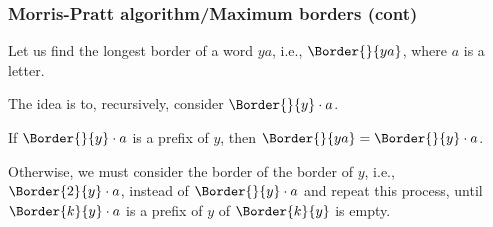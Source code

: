 %
\begin{frame}
\frametitle{Morris-Pratt algorithm/Maximum borders (cont)}

Let us find the longest border of a word \(ya\),
i.e., \(\Border{}{ya}\), where \(a\) is a letter. 

\bigskip

The idea is to, recursively, consider \(\Border{}{y} \cdot a\).

\bigskip

If \(\Border{}{y} \cdot a\) is a prefix of \(y\), then
\(\Border{}{ya} = \Border{}{y} \cdot a\).

\bigskip

Otherwise, we must consider the border of the border of \(y\),
i.e., \(\Border{2}{y} \cdot a\), instead of \(\Border{}{y} \cdot a\)
and repeat this process, until \(\Border{k}{y} \cdot a\) is a prefix
of \(y\) of \(\Border{k}{y}\) is empty.

\end{frame}








